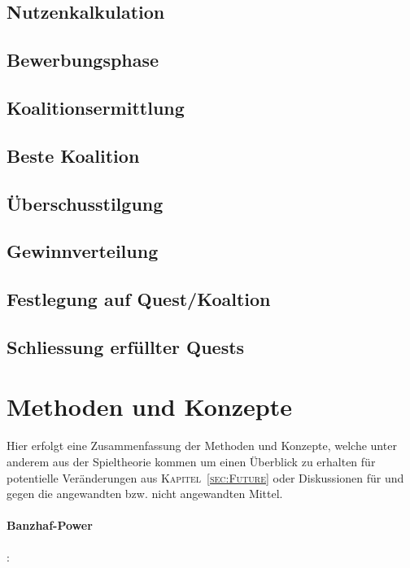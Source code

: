 \documentclass[fleqn,10pt]{SelfArx} %
\newcommand{\ChapterCite}[1]{\textsc{Kapitel~\ref{#1}}}
\begin{document}
\subsection{Nutzenkalkulation}

\subsection{Bewerbungsphase}

\subsection{Koalitionsermittlung}

\subsection{Beste Koalition}

\subsection{Überschusstilgung}

\subsection{Gewinnverteilung}

\subsection{Festlegung auf Quest/Koaltion}

\subsection{Schliessung erfüllter Quests}

\section{Methoden und Konzepte}
\label{sec:Methoden}
Hier erfolgt eine Zusammenfassung der Methoden und Konzepte, welche unter anderem aus der Spieltheorie kommen um einen Überblick zu erhalten für potentielle Veränderungen aus \ChapterCite{sec:Future} oder Diskussionen für und gegen die angewandten bzw. nicht angewandten Mittel.

\paragraph{Banzhaf-Power}: 
\end{document}
